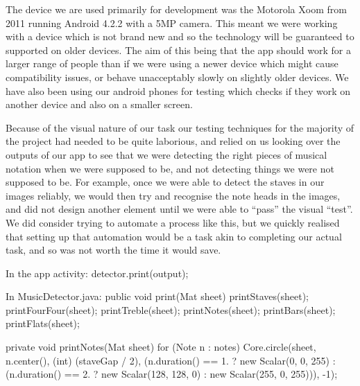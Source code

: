 The device we are used primarily for development was the Motorola Xoom from 2011 running Android 4.2.2 with a 5MP camera. This meant we were working with a device which is not brand new and so the technology will be guaranteed to supported on older devices. The aim of this being that the app should work for a larger range of people than if we were using a newer device which might cause compatibility issues, or behave unacceptably slowly on slightly older devices. We have also
been using our android phones for testing which checks if they work on another device and also on a smaller screen.

Because of the visual nature of our task our testing techniques for the majority of the project had needed to be quite laborious, and relied on us looking over the outputs of our app to see that we were detecting the right pieces of musical notation when we were supposed to be, and not detecting things we were not supposed to be. For example, once we were able to detect the staves in our images reliably, we would then try and recognise the note heads in the images, and did not design
another element until we were able to “pass” the visual “test”. We did consider trying to automate a process like this, but we quickly realised that setting up that automation would be a task akin to completing our actual task, and so was not worth the time it would save.


In the app activity:
detector.print(output);


In MusicDetector.java:
public void print(Mat sheet) {
printStaves(sheet);
printFourFour(sheet);
printTreble(sheet);
printNotes(sheet);
                        printBars(sheet);
                                                printFlats(sheet);
                                                            }


                                                            private void printNotes(Mat sheet) {
                                                                                        for (Note n : notes)
                                                                                                                                Core.circle(sheet, n.center(), (int) (staveGap / 2),
                                                                                                                                                                                (n.duration() == 1. ? new Scalar(0, 0, 255)
                                                                                                                                                                                                                                            : (n.duration() == 2. ? new Scalar(128, 128, 0)
                                                                                                                                                                                                                                                                                                                    : new Scalar(255, 0, 255))), -1);
                                                            }


